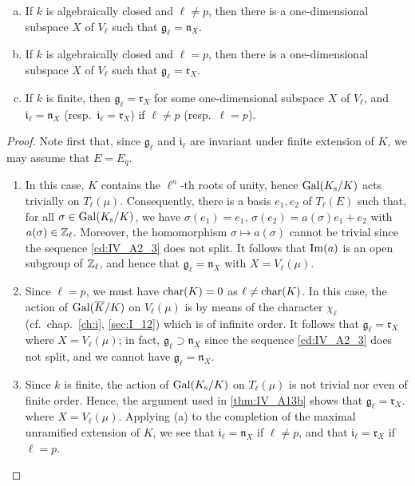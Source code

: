 \begin{subappendices}
\begin{thm}
\begin{enumerate}[(a)]
	\item\label{thm:IV_A13a}
		If $k$ is algebraically closed and $\ell \ne p$, then there is a
		one-dimensional subspace $X$ of $V_\ell$ such that
		$\mathfrak{g}_\ell = \mathfrak{n}_X$.
	\item\label{thm:IV_A13b}
		If $k$ is algebraically closed and $\ell = p$, then there is a
		one-dimensional subspace $X$ of $V_\ell$ such that
		$\mathfrak{g}_\ell = \mathfrak{r}_X$.
	\item If $k$ is finite, then $\mathfrak{g}_\ell = \mathfrak{r}_X$ for
		some one-dimensional subspace $X$ of $V_\ell$, and
		$\mathfrak{i}_\ell = \mathfrak{n}_X$ (resp.\ $\mathfrak{i}_\ell
		= \mathfrak{r}_X$) if $\ell \ne p$ (resp.\ $\ell = p$).
\end{enumerate}
\end{thm}
\begin{proof}
Note first that, since $\mathfrak{g}_\ell$ and $\mathfrak{i}_\ell$ are invariant under finite
extension of $K$, we may assume that $E = E_q$.
\begin{enumerate}[wide]
	\item In this case, $K$ contains the $\ell^n$-th roots of unity, hence
		$\operatorname{Gal}(K_{\mathrm{s}}/K)$ acts trivially on $T_\ell(\mu)$.
		Consequently, there is a basis $e_1, e_2$ of $T_\ell(E)$ such
		that, for all $\sigma \in \operatorname{Gal}(K_{\mathrm{s}}/K)$, we have
		$\sigma(e_1) = e_1$, $\sigma(e_2) = a(\sigma)e_1 + e_2$ with
		$a(\sigma) \in \mathbb{Z}_\ell$. Moreover, the homomorphism $\sigma
		\mapsto a(\sigma)$ cannot be trivial since the sequence
		\eqref{cd:IV_A2_3} does not split. It follows that $\operatorname{Im}(a)$ is
		an open subgroup of $\mathbb{Z}_\ell$, and hence that
		$\mathfrak{g}_\ell = \mathfrak{n}_X$ with $X = V_\ell(\mu)$.
	\item Since $\ell = p$, we must have $\operatorname{char}(K) = 0$ as $\ell \ne
		\operatorname{char}(K)$.  In this case, the action of $\operatorname{Gal}(\overline{K}/K)$ on
		$V_\ell(\mu)$ is by means of the character $\chi_\ell$ (cf.\
		chap.~\ref{ch:i}, \ref{sec:I_12}) which is of infinite order.
		It follows
		\dpage
		that $\mathfrak{g}_\ell = \mathfrak{r}_X$ where $X =
		V_\ell(\mu)$; in fact, $\mathfrak{g}_\ell \supset
		\mathfrak{n}_X$ since the sequence \eqref{cd:IV_A2_3} does not
		split, and we cannot have $\mathfrak{g}_\ell = \mathfrak{n}_X$.
	\item Since $k$ is finite, the action of $\operatorname{Gal}(K_{\mathrm{s}}/K)$ on
		$T_\ell(\mu)$ is not trivial nor even of finite order. Hence,
		the argument used in \ref{thm:IV_A13b} shows that
		$\mathfrak{g}_\ell = \mathfrak{r}_X$. where $X = V_\ell(\mu)$.
		Applying (a) to the completion of the maximal unramified
		extension of $K$, we see that $\mathfrak{i}_\ell =
		\mathfrak{n}_X$ if $\ell \ne p$, and that $\mathfrak{i}_\ell =
		\mathfrak{r}_X$ if $\ell = p$.  \qedhere
\end{enumerate}
\end{proof}


\end{subappendices}
